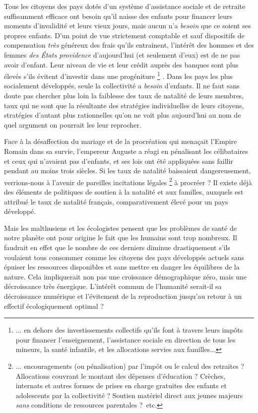  
 Tous les citoyens des pays dotés d'un système d'assistance sociale et de retraite suffisamment efficace ont besoin qu'il naisse des enfants pour financer leurs moments d'invalidité et leurs vieux jours, mais aucun n'a \emph{besoin} que ce soient ses propres enfants. D'un point de vue strictement comptable et sauf dispositifs de compensation \emph{très}  généreux des frais qu'ils entrainent, l'intérêt des hommes et des femmes \emph{des États providence} d'aujourd'hui (et seulement d'eux) est de ne pas avoir d'enfant. Leur niveau de vie et leur crédit auprès des banques sont plus élevés s'ils évitent d'investir dans une progéniture
\footnote{... en dehors des investissements collectifs qu'ils font à travers leurs impôts pour financer l'enseignement, l'assistance sociale en direction de tous les mineurs, la santé infantile, et les allocations servies aux familles...} 
. Dans les pays les plus socialement développés, seule la collectivité a \emph{besoin} d'enfants. Il ne faut sans doute pas chercher plus loin la faiblesse des taux de natalité de leurs membres, taux qui ne sont que la résultante des stratégies individuelles de leurs citoyens, stratégies d'autant plus rationnelles qu'on ne voit plus aujourd'hui au nom de quel argument on pourrait les leur reprocher. 
 
 Face à la désaffection du mariage et de la procréation qui menaçait l'Empire Romain dans sa survie, l'empereur Auguste a réagi en pénalisant les célibataires et ceux qui n'avaient pas d'enfants, et ses lois ont été appliquées sans faillir pendant au moins trois siècles. Si les taux de natalité baissaient dangereusement, verrions-nous à l'avenir de pareilles incitations légales
\footnote{... encouragements (ou pénalisation) par l'impôt ou le calcul des retraites ? Allocations couvrant le montant des dépenses d'éducation ? Crèches, internats et autres formes de prises en charge gratuites des enfants et adolescents par la collectivité ? Soutien matériel direct aux jeunes majeurs \emph{sans} conditions de ressources parentales ?~etc.} 
à procréer ? Il existe déjà des éléments de politiques de soutien à la natalité et aux familles, auxquels est attribué le taux de natalité français, comparativement élevé pour un pays développé.
 
 Mais les malthusiens et les écologistes pensent que les problèmes de santé de notre planète ont pour origine le fait que les humains sont trop nombreux. Il faudrait en effet que le nombre de ces derniers diminue drastiquement s'ils voulaient tous consommer comme les citoyens des pays développés actuels sans épuiser les ressources disponibles et sans mettre en danger les équilibres de la nature. Cela impliquerait non pas une croissance démographique zéro, mais une décroissance très énergique. L'intérêt commun de l'humanité serait-il sa décroissance numérique et l'évitement de la reproduction jusqu'au retour à un effectif écologiquement optimal ? 
 




